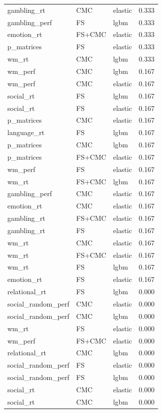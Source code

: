 \documentclass{article}
\begin{document}
\begin{longtable}{lllr}
	gambling\_rt & CMC & elastic & 0.333 \\
	gambling\_perf & FS & lgbm & 0.333 \\
	emotion\_rt & FS+CMC & elastic & 0.333 \\
	p\_matrices & FS & elastic & 0.333 \\
	wm\_rt & CMC & lgbm & 0.333 \\
	wm\_perf & CMC & lgbm & 0.167 \\
	wm\_perf & CMC & elastic & 0.167 \\
	social\_rt & FS & lgbm & 0.167 \\
	social\_rt & FS & elastic & 0.167 \\
	p\_matrices & CMC & elastic & 0.167 \\
	language\_rt & FS & lgbm & 0.167 \\
	p\_matrices & CMC & lgbm & 0.167 \\
	p\_matrices & FS+CMC & elastic & 0.167 \\
	wm\_perf & FS & elastic & 0.167 \\
	wm\_rt & FS+CMC & lgbm & 0.167 \\
	gambling\_perf & CMC & elastic & 0.167 \\
	emotion\_rt & CMC & elastic & 0.167 \\
	gambling\_rt & FS+CMC & elastic & 0.167 \\
	gambling\_rt & FS & elastic & 0.167 \\
	wm\_rt & CMC & elastic & 0.167 \\
	wm\_rt & FS+CMC & elastic & 0.167 \\
	wm\_rt & FS & lgbm & 0.167 \\
	emotion\_rt & FS & elastic & 0.167 \\
	relational\_rt & FS & lgbm & 0.000 \\
	social\_random\_perf & CMC & elastic & 0.000 \\
	social\_random\_perf & CMC & lgbm & 0.000 \\
	wm\_rt & FS & elastic & 0.000 \\
	wm\_perf & FS+CMC & elastic & 0.000 \\
	relational\_rt & CMC & lgbm & 0.000 \\
	social\_random\_perf & FS & elastic & 0.000 \\
	social\_random\_perf & FS & lgbm & 0.000 \\
	social\_rt & CMC & elastic & 0.000 \\
	social\_rt & CMC & lgbm & 0.000 \\

\end{longtable}
\end{document}
